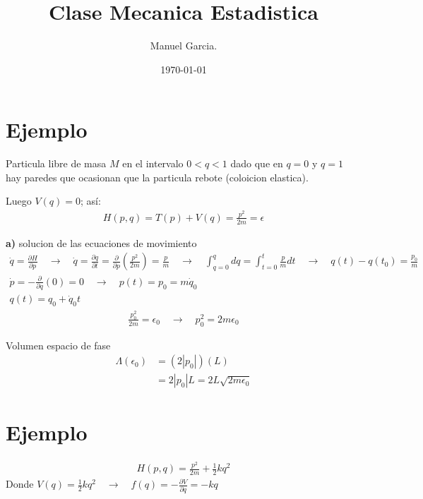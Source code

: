 \documentclass{article}
\title{Clase Mecanica Estadistica }
\author{Manuel Garcia.}
\date{\today}
\begin{document}
\maketitle

\section{Ejemplo}
Particula libre de masa $ M  $ en el intervalo $ 0<q<1  $ dado que en $ q = 0  $ y $ q = 1  $ hay paredes que ocasionan que la particula rebote (coloicion elastica). 

Luego $ V(q)=0  $; así: 
\begin{gather*}
  H(p,q) = T(p) + V(q) = \frac{p^2 }{2m } = \epsilon 
\end{gather*}

\textbf{a) } solucion de las ecuaciones de movimiento 
\begin{gather*}
  \dot q = \frac{\partial H  }{\partial p } \quad \rightarrow \quad \dot q = \frac{\partial q  }{\partial t } = \frac{\partial  }{\partial p } \left(\frac{p^2 }{2m }\right) = \frac{p }{ m } \quad \rightarrow \quad \displaystyle\int_{q = 0 }^{q } dq = \displaystyle\int_{t = 0 }^{t } \frac{p}{m } dt  \quad \rightarrow \quad q(t) - q(t_0 ) = \frac{p_0 }{m } 
  \\
  \dot p = - \frac{\partial  }{\partial q } ( 0 ) = 0 \quad \rightarrow \quad p(t) = p_0 = m \dot q_0 
  \\
  q(t) = q_0 + \dot q_0 t 
\end{gather*}
\begin{gather*}
  \frac{p_0^2 }{2m } = \epsilon_0 \quad \rightarrow \quad p_0^2 = 2m \epsilon_0  
\end{gather*}

Volumen espacio de fase 
\begin{align*}
  \Lambda(\epsilon_0 ) &= (2 \left|p_0 \right|) (L) \\
          &= 2 \left|p_0 \right|L = 2L \sqrt{2m \epsilon_0 } 
\end{align*}


\section{Ejemplo }
\begin{gather*}
  H(p, q) = \frac{p^2 }{2m } + \frac{1}{2} kq^2    
\end{gather*}
Donde $ V(q) = \frac{1}{2} k q^2  \quad \rightarrow \quad f(q) = - \frac{\partial V  }{\partial q } = - k q   $
\end{document}
